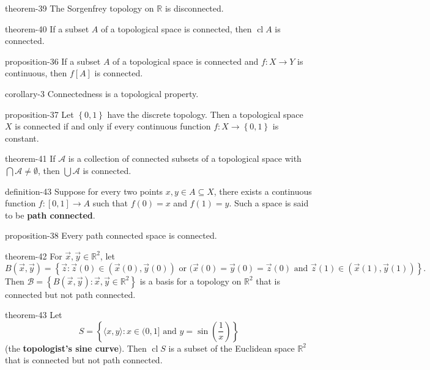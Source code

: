 \documentclass[10pt,]{article}
\newcommand{\terminology}[1]{\textbf{#1}}
\newcommand{\tuple}[1]{\langle #1 \rangle}
\newcommand{\mb}{\mathbb}
\newcommand{\mc}{\mathcal}
\newcommand{\cl}{\operatorname{cl}}
\newcommand{\setBuilder}[2]{\left\{#1:#2\right\}}
\newcommand{\setList}[1]{\left\{#1\right\}}
\begin{document}
\begin{theorem}{}{}{theorem-39}%
\hypertarget{p-163}{}%
The Sorgenfrey topology on \(\mb R\) is disconnected.%
\end{theorem}
\begin{theorem}{}{}{theorem-40}%
\hypertarget{p-164}{}%
If a subset \(A\) of a topological space is connected, then \(\cl A\) is connected.%
\end{theorem}
\begin{proposition}{}{}{proposition-36}%
\hypertarget{p-165}{}%
If a subset \(A\) of a topological space is connected and \(f:X\to Y\) is continuous, then \(f[A]\) is connected.%
\end{proposition}
\begin{corollary}{}{}{corollary-3}%
\hypertarget{p-166}{}%
Connectedness is a topological property.%
\end{corollary}
\begin{proposition}{}{}{proposition-37}%
\hypertarget{p-167}{}%
Let \(\setList{0,1}\) have the discrete topology. Then a topological space \(X\) is connected if and only if every continuous function \(f:X\to\setList{0,1}\) is constant.%
\end{proposition}
\begin{theorem}{}{}{theorem-41}%
\hypertarget{p-168}{}%
If \(\mc A\) is a collection of connected subsets of a topological space with \(\bigcap\mc A\not=\emptyset\), then \(\bigcup\mc A\) is connected.%
\end{theorem}
\begin{definition}{}{definition-43}%
\hypertarget{p-169}{}%
Suppose for every two points \(x,y\in A\subseteq X\), there exists a continuous function \(f:[0,1]\to A\) such that \(f(0)=x\) and \(f(1)=y\). Such a space is said to be \terminology{path connected}.%
\end{definition}
\begin{proposition}{}{}{proposition-38}%
\hypertarget{p-170}{}%
Every path connected space is connected.%
\end{proposition}
\begin{theorem}{}{}{theorem-42}%
\hypertarget{p-171}{}%
For \(\vec x,\vec y\in\mb R^2\), let%
\begin{equation*}
B(\vec x,\vec y)=\setBuilder{\vec z}{\vec z(0)\in(\vec x(0),\vec y(0))
\text{ or } (\vec x(0)=\vec y(0)=\vec z(0) \text{ and }
\vec z(1)\in(\vec x(1),\vec y(1))}\text{.}
\end{equation*}
Then \(\mc B=\setBuilder{B(\vec x,\vec y)}{\vec x,\vec y\in\mb R^2}\) is a basis for a topology on \(\mb R^2\) that is connected but not path connected.%
\end{theorem}
\begin{theorem}{}{}{theorem-43}%
\hypertarget{p-172}{}%
Let%
\begin{equation*}
S=
\setBuilder{\tuple{x,y}}{x\in(0,1]\text{ and }
y=\sin\left(\frac{1}{x}\right)}
\end{equation*}
(the \terminology{topologist's sine curve}). Then \(\cl S\) is a subset of the Euclidean space \(\mb R^2\) that is connected but not path connected.%
\end{theorem}
%
%
\typeout{************************************************}
\typeout{************************************************}
%
\end{document}
